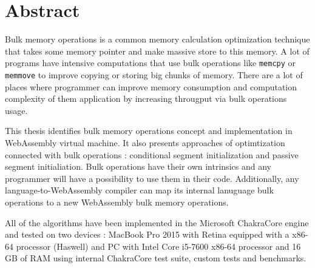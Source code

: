 \chapter*{Abstract}
 
Bulk memory operations is a common memory calculation optimization technique that takes some memory pointer and make massive store to this memory. 
A lot of programs have intensive computations that use bulk operations like \texttt{memcpy} or \texttt{memmove} to improve copying or storing big chunks of memory. 
There are a lot of places where programmer can improve memory consumption and computation complexity of them application by increasing througput via bulk operations usage.

This thesis identifies bulk memory operations concept and implementation in WebAssembly virtual machine. 
It also presents approaches of optimtization connected with bulk operations : conditional segment initialization and passive segment initialiation. 
Bulk operations have their own intrinsics and any programmer will have a possibility to use them in their code. 
Additionally, any language-to-WebAssembly compiler can map its internal lanuguage bulk operations to a new WebAssembly bulk memory operations.   

All of the algorithms have been implemented in the Microsoft ChakraCore engine and tested on two devices : MacBook Pro 2015 with Retina equipped with a x86-64 processor (Haswell) 
and PC with Intel Core i5-7600 x86-64 processor and 16 GB of RAM using internal ChakraCore test suite, custom tests and benchmarks.  